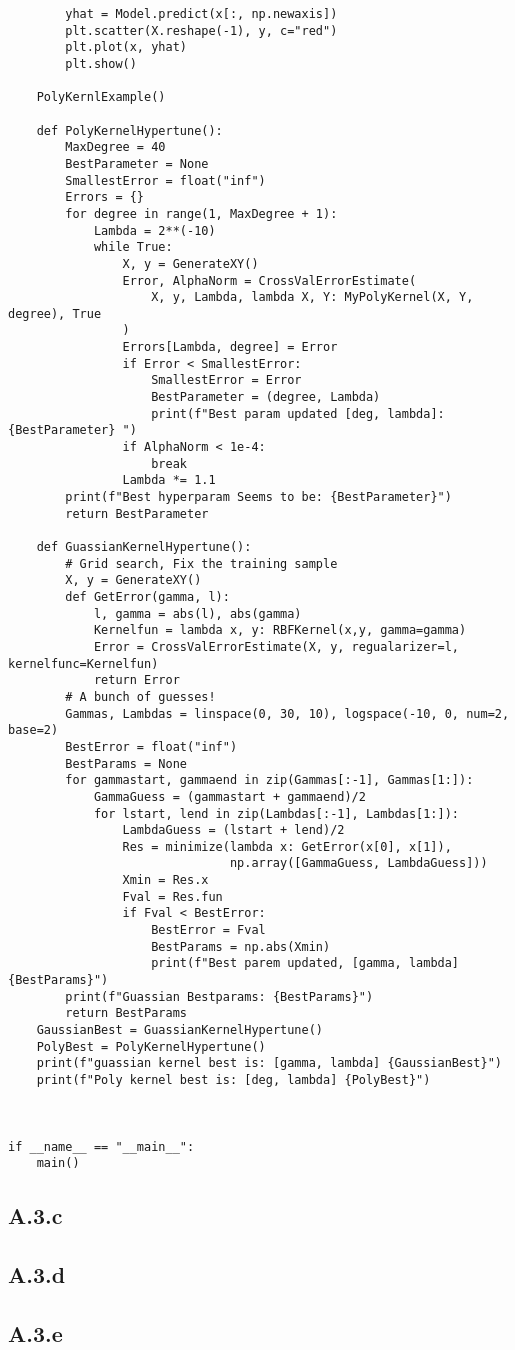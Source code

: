 \documentclass[]{article}
\begin{document}
\begin{lstlisting}
        yhat = Model.predict(x[:, np.newaxis])
        plt.scatter(X.reshape(-1), y, c="red")
        plt.plot(x, yhat)
        plt.show()

    PolyKernlExample()

    def PolyKernelHypertune():
        MaxDegree = 40
        BestParameter = None
        SmallestError = float("inf")
        Errors = {}
        for degree in range(1, MaxDegree + 1):
            Lambda = 2**(-10)
            while True:
                X, y = GenerateXY()
                Error, AlphaNorm = CrossValErrorEstimate(
                    X, y, Lambda, lambda X, Y: MyPolyKernel(X, Y, degree), True
                )
                Errors[Lambda, degree] = Error
                if Error < SmallestError:
                    SmallestError = Error
                    BestParameter = (degree, Lambda)
                    print(f"Best param updated [deg, lambda]:{BestParameter} ")
                if AlphaNorm < 1e-4:
                    break
                Lambda *= 1.1
        print(f"Best hyperparam Seems to be: {BestParameter}")
        return BestParameter

    def GuassianKernelHypertune():
        # Grid search, Fix the training sample
        X, y = GenerateXY()
        def GetError(gamma, l):
            l, gamma = abs(l), abs(gamma)
            Kernelfun = lambda x, y: RBFKernel(x,y, gamma=gamma)
            Error = CrossValErrorEstimate(X, y, regualarizer=l, kernelfunc=Kernelfun)
            return Error
        # A bunch of guesses!
        Gammas, Lambdas = linspace(0, 30, 10), logspace(-10, 0, num=2, base=2)
        BestError = float("inf")
        BestParams = None
        for gammastart, gammaend in zip(Gammas[:-1], Gammas[1:]):
            GammaGuess = (gammastart + gammaend)/2
            for lstart, lend in zip(Lambdas[:-1], Lambdas[1:]):
                LambdaGuess = (lstart + lend)/2
                Res = minimize(lambda x: GetError(x[0], x[1]),
                               np.array([GammaGuess, LambdaGuess]))
                Xmin = Res.x
                Fval = Res.fun
                if Fval < BestError:
                    BestError = Fval
                    BestParams = np.abs(Xmin)
                    print(f"Best parem updated, [gamma, lambda] {BestParams}")
        print(f"Guassian Bestparams: {BestParams}")
        return BestParams
    GaussianBest = GuassianKernelHypertune()
    PolyBest = PolyKernelHypertune()
    print(f"guassian kernel best is: [gamma, lambda] {GaussianBest}")
    print(f"Poly kernel best is: [deg, lambda] {PolyBest}")



if __name__ == "__main__":
    main()
        \end{lstlisting}
        
        
    \subsection*{A.3.c}
        
    \subsection*{A.3.d}

    \subsection*{A.3.e}
    
    
\end{document}
